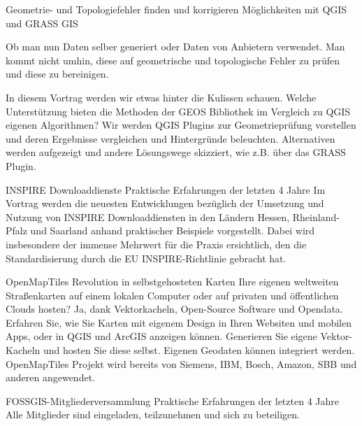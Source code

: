 %
{Geometrie- und Topologiefehler finden und korrigieren}%
{Möglichkeiten mit QGIS und GRASS GIS}%
{%
Ob man nun Daten selber generiert oder Daten von Anbietern verwendet. Man kommt nicht umhin, diese auf geometrische und topologische Fehler zu prüfen und diese zu bereinigen. 

In diesem Vortrag werden wir etwas hinter die Kulissen schauen. Welche Unterstützung bieten die Methoden der GEOS Bibliothek im Vergleich zu QGIS eigenen Algorithmen? Wir werden QGIS Plugins zur Geometrieprüfung vorstellen und deren Ergebnisse vergleichen und Hintergründe beleuchten. Alternativen werden aufgezeigt und andere Lösungswege skizziert, wie z.B. über das GRASS Plugin.%
}

%
{INSPIRE Downloaddienste}%
{Praktische Erfahrungen der letzten 4 Jahre}%
{%
Im Vortrag werden die neuesten Entwicklungen bezüglich der Umsetzung und Nutzung von INSPIRE Downloaddiensten in den Ländern Hessen, Rheinland-Pfalz und Saarland anhand praktischer Beispiele vorgestellt. Dabei wird insbesondere der immense Mehrwert für die Praxis ersichtlich, den die Standardisierung durch die EU INSPIRE-Richtlinie gebracht hat.%
}

%
{OpenMapTiles}%
{Revolution in selbstgehosteten Karten}%
{%
Ihre eigenen weltweiten Straßenkarten auf einem lokalen Computer oder auf privaten und öffentlichen Clouds hosten? Ja, dank Vektorkacheln, Open-Source Software und Opendata. Erfahren Sie, wie Sie Karten mit eigenem Design in Ihren Websiten und mobilen Apps, oder in QGIS und ArcGIS anzeigen können. Generieren Sie eigene Vektor-Kacheln und hosten Sie diese selbst. Eigenen Geodaten können integriert werden. OpenMapTiles Projekt wird bereits von Siemens, IBM, Bosch, Amazon, SBB und anderen angewendet.%
}

\abstractZwei{}%
{FOSSGIS-Mitgliederversammlung}%
{Praktische Erfahrungen der letzten 4 Jahre}%
{%
Alle Mitglieder sind eingeladen, teilzunehmen und sich zu beteiligen.%
}
